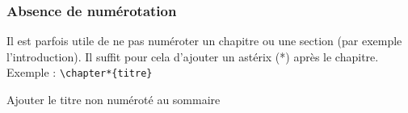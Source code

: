\begin{frame}[containsverbatim]
    \frametitle{Absence de numérotation}
    Il est parfois utile de ne pas numéroter un chapitre ou une section (par exemple l'introduction).
    Il suffit pour cela d'ajouter un astérix (*) après le chapitre. \\
    Exemple : \verb|\chapter*{titre}|
    \bigskip
    \begin{exampleblock}{Ajouter le titre non numéroté au sommaire}
        \encours
    \end{exampleblock}
\end{frame}